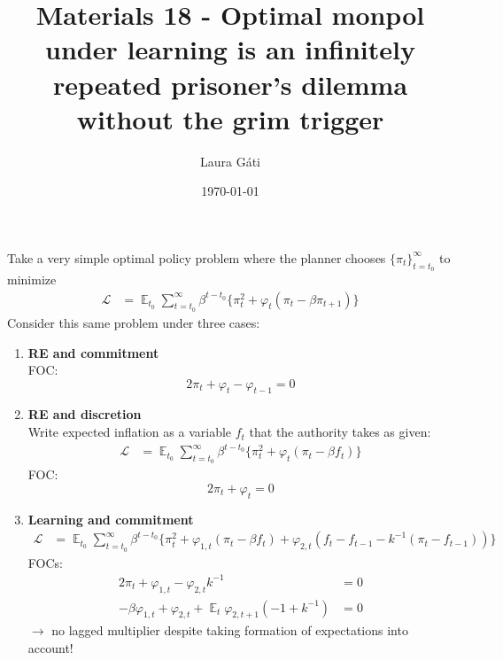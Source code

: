 \documentclass[11pt]{article}
\renewcommand{\[}{\begin{equation}}
\renewcommand{\]}{\end{equation}}
\DeclareMathOperator{\E}{\mathbb{E}}
\begin{document}
\linespread{1.0}

\title{Materials 18 - Optimal monpol under learning is an infinitely repeated prisoner's dilemma without the grim trigger}
\author{Laura G\'ati} 
\date{\today}
\maketitle





Take a very simple optimal policy problem where the planner chooses $\{\pi_t\}_{t=t_0}^{\infty}$ to minimize
\begin{align}
\mathcal{L} &= \E_{t_0}\sum_{t=t_0}^{\infty} \beta^{t-t_0}\bigg\{ \pi_t^2  + \varphi_{t} (\pi_t - \beta \pi_{t+1} ) \bigg\} \label{commitment}
 \end{align}
 Consider this same problem under three cases:
 \begin{enumerate}
 \item \textbf{RE and commitment} \\
 FOC:
 \begin{equation}
 2\pi_t +\varphi_t - \varphi_{t-1} = 0 \label{FOCcommitment}
 \end{equation}

 \item \textbf{RE and discretion} \\
 Write expected inflation as a variable $f_t$ that the authority takes as given:
\begin{align}
\mathcal{L} &= \E_{t_0}\sum_{t=t_0}^{\infty} \beta^{t-t_0}\bigg\{ \pi_t^2  + \varphi_{t} (\pi_t - \beta f_t) \bigg\} \label{discretion}
 \end{align}
FOC:
 \begin{equation}
 2\pi_t +\varphi_t = 0 \label{FOCdiscretion}
 \end{equation}
 \item \textbf{Learning and commitment} 
 \begin{align}
\mathcal{L} &= \E_{t_0}\sum_{t=t_0}^{\infty} \beta^{t-t_0}\bigg\{ \pi_t^2  + \varphi_{1,t} (\pi_t - \beta f_t) + \varphi_{2,t}(f_t - f_{t-1} -k^{-1}(\pi_t - f_{t-1})) \bigg\} \label{learning}
 \end{align}
 FOCs:
 \begin{align}
  2\pi_t +\varphi_{1,t} -\varphi_{2,t}k^{-1} & = 0 \label{FOC1learn} \\
  -\beta\varphi_{1,t} + \varphi_{2,t} + \E_{t}\varphi_{2,t+1}(-1 + k^{-1})  & = 0 \label{FOC2learn} 
 \end{align}
$\rightarrow$ no lagged multiplier despite taking formation of expectations into account!
 \end{enumerate}
 
\end{document}
